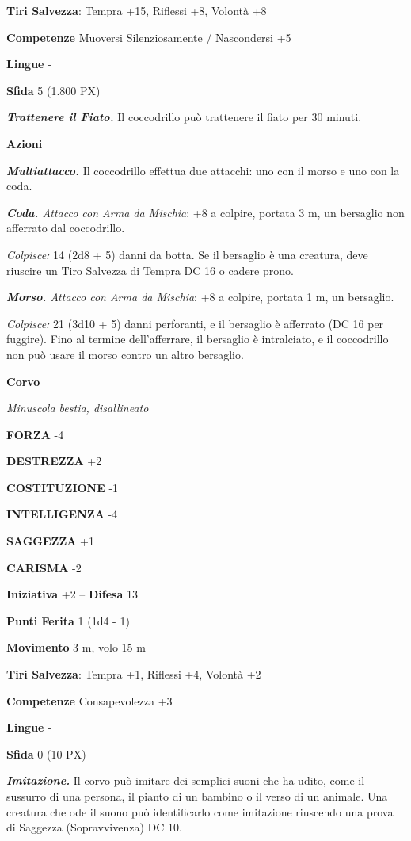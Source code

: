 \begin{multicols}{2}
\textbf{Tiri Salvezza}: Tempra +15, Riflessi +8, Volontà +8

\textbf{Competenze} Muoversi Silenziosamente / Nascondersi +5

\textbf{Lingue} -

\textbf{Sfida} 5 (1.800 PX)

\textit{\textbf{Trattenere il Fiato.}} Il coccodrillo può trattenere il fiato per 30 minuti.

\textbf{Azioni}

\textit{\textbf{Multiattacco.}} Il coccodrillo effettua due attacchi: uno con il morso e uno con la coda.

\textit{\textbf{Coda.} Attacco con Arma da Mischia}: +8 a colpire, portata 3 m, un bersaglio non afferrato dal coccodrillo.

\textit{Colpisce:} 14 (2d8 + 5) danni da botta. Se il bersaglio è una creatura, deve riuscire un Tiro Salvezza di Tempra DC 16 o cadere prono.

\textit{\textbf{Morso.} Attacco con Arma da Mischia}: +8 a colpire, portata 1 m, un bersaglio.

\textit{Colpisce:} 21 (3d10 + 5) danni perforanti, e il bersaglio è afferrato (DC 16 per fuggire). Fino al termine dell'afferrare, il bersaglio è intralciato, e il coccodrillo non può usare il morso contro un altro bersaglio.

\medskip\textbf{Corvo}

\textit{Minuscola bestia, disallineato}

\textbf{FORZA} -4

\textbf{DESTREZZA} +2

\textbf{COSTITUZIONE} -1

\textbf{INTELLIGENZA} -4

\textbf{SAGGEZZA} +1

\textbf{CARISMA} -2

\textbf{Iniziativa} +2 -- \textbf{Difesa} 13

\textbf{Punti Ferita} 1 (1d4 - 1)

\textbf{Movimento} 3 m, volo 15 m

\textbf{Tiri Salvezza}: Tempra +1, Riflessi +4, Volontà +2

\textbf{Competenze} Consapevolezza +3

\textbf{Lingue} -

\textbf{Sfida} 0 (10 PX)

\textit{\textbf{Imitazione.}} Il corvo può imitare dei semplici suoni che ha udito, come il sussurro di una persona, il pianto di un bambino o il verso di un animale. Una creatura che ode il suono può identificarlo come imitazione riuscendo una prova di Saggezza (Sopravvivenza) DC 10.


\end{multicols}
